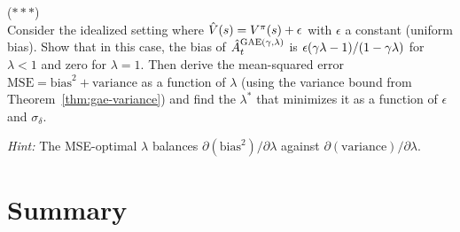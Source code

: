 \documentclass[11pt,a4paper]{article}
\begin{document}
\begin{exercise}
\textnormal{(\(***\))} \\
  Consider the idealized setting where $\hat{V}(s) = V^{\pi}(s) +
  \epsilon$ with $\epsilon$ a constant (uniform bias). Show that in
  this case, the bias of $\hat{A}_t^{\mathrm{GAE}(\gamma,\lambda)}$
  is $\epsilon(\gamma\lambda - 1)/(1 - \gamma\lambda)$ for
  $\lambda < 1$ and zero for $\lambda = 1$. Then derive the
  mean-squared error $\mathrm{MSE} = \mathrm{bias}^2 + \mathrm{variance}$
  as a function of $\lambda$ (using the variance bound from
  Theorem~\ref{thm:gae-variance}) and find the $\lambda^*$ that
  minimizes it as a function of $\epsilon$ and $\sigma_\delta$.

  \textit{Hint:} The MSE-optimal $\lambda$ balances
  $\partial(\mathrm{bias}^2)/\partial\lambda$ against
  $\partial(\mathrm{variance})/\partial\lambda$.
\end{exercise}

\section{Summary}
\end{document}

